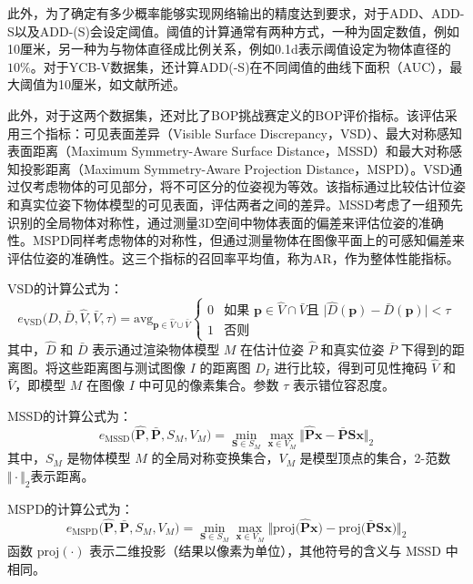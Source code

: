 \par 此外，为了确定有多少概率能够实现网络输出的精度达到要求，对于ADD、ADD-S以及ADD-(S)会设定阈值。阈值的计算通常有两种方式，一种为固定数值，例如10厘米，另一种为与物体直径成比例关系，例如0.1d表示阈值设定为物体直径的$10\%$。对于YCB-V数据集，还计算ADD(-S)在不同阈值的曲线下面积（AUC），最大阈值为10厘米，如文献\cite{ycbv}所述。

\par 此外，对于这两个数据集，还对比了BOP挑战赛定义的BOP评价指标\cite{Sundermeyer2023BOPC2}。该评估采用三个指标：可见表面差异（Visible Surface Discrepancy，VSD）、最大对称感知表面距离（Maximum Symmetry-Aware Surface Distance，MSSD）和最大对称感知投影距离（Maximum Symmetry-Aware Projection Distance，MSPD）。VSD通过仅考虑物体的可见部分，将不可区分的位姿视为等效。该指标通过比较估计位姿和真实位姿下物体模型的可见表面，评估两者之间的差异。MSSD考虑了一组预先识别的全局物体对称性，通过测量3D空间中物体表面的偏差来评估位姿的准确性。MSPD同样考虑物体的对称性，但通过测量物体在图像平面上的可感知偏差来评估位姿的准确性。这三个指标的召回率平均值，称为AR，作为整体性能指标。

\par VSD的计算公式为：
\begin{equation}
e_\mathrm{VSD}\big(\hat{D}, \bar{D}, \hat{V}, \bar{V}, \tau\big) =
\mathrm{avg}_{\bm{p} \in \hat{V} \cup \bar{V}}
\begin{cases}
0 & \text{如果 } \bm{p} \in \hat{V} \cap \bar{V} \text{且 } \big|\hat{D}(\bm{p}) - \bar{D}(\bm{p})\big| < \tau \\
1 & \text{否则}
\end{cases}
\end{equation}
其中，$\hat{D}$ 和 $\bar{D}$ 表示通过渲染物体模型 $M$ 在估计位姿 $\hat{P}$ 和真实位姿 $\bar{P}$ 下得到的距离图。将这些距离图与测试图像 $I$ 的距离图 $D_I$ 进行比较，得到可见性掩码 $\hat{V}$ 和 $\bar{V}$，即模型 $M$ 在图像 $I$ 中可见的像素集合。参数 $\tau$ 表示错位容忍度。

\par MSSD的计算公式为：
\begin{equation}
e_{\text{MSSD}}\big(\hat{\bm{P}}, \bar{\bm{P}}, S_M, V_M\big) = \min_{\bm{S} \in S_M} \max_{\bm{x} \in V_M}
\big\Vert \hat{\bm{P}}\bm{x} - \bar{\bm{P}}\bm{S}\bm{x} \big\Vert_2
\end{equation}
其中，$S_M$ 是物体模型 $M$ 的全局对称变换集合，$V_M$ 是模型顶点的集合，2-范数$\big\Vert \cdot \big\Vert_2$表示距离。

\par MSPD的计算公式为：
\begin{equation}
e_{\text{MSPD}}\big(\hat{\bm{P}}, \bar{\bm{P}}, S_M, V_M\big) = \min_{\bm{S} \in S_M} \max_{\bm{x} \in V_M}
\big\Vert \text{proj}\big( \hat{\bm{P}}\bm{x} \big) - \text{proj}\big( \bar{\bm{P}}\bm{S}\bm{x} \big) \big\Vert_2
\end{equation}
函数 $\text{proj}(\cdot)$ 表示二维投影（结果以像素为单位），其他符号的含义与 MSSD 中相同。

